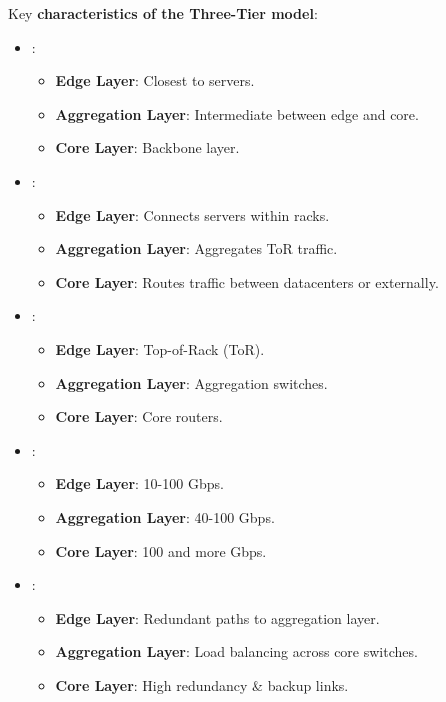 Key \textbf{characteristics of the Three-Tier model}:
\begin{itemize}
    \item {}:
    \begin{itemize}
        \item \textbf{Edge Layer}: Closest to servers.
        \item \textbf{Aggregation Layer}: Intermediate between edge and core.
        \item \textbf{Core Layer}: Backbone layer.
    \end{itemize}
    \item {}:
    \begin{itemize}
        \item \textbf{Edge Layer}: Connects servers within racks.
        \item \textbf{Aggregation Layer}: Aggregates ToR traffic.
        \item \textbf{Core Layer}: Routes traffic between datacenters or externally.
    \end{itemize}
    \item {}:
    \begin{itemize}
        \item \textbf{Edge Layer}: Top-of-Rack (ToR).
        \item \textbf{Aggregation Layer}: Aggregation switches.
        \item \textbf{Core Layer}: Core routers.
    \end{itemize}
    \item {}:
    \begin{itemize}
        \item \textbf{Edge Layer}: 10-100 Gbps.
        \item \textbf{Aggregation Layer}: 40-100 Gbps.
        \item \textbf{Core Layer}: 100 and more Gbps.
    \end{itemize}
    \item {}:
    \begin{itemize}
        \item \textbf{Edge Layer}: Redundant paths to aggregation layer.
        \item \textbf{Aggregation Layer}: Load balancing across core switches.
        \item \textbf{Core Layer}: High redundancy \& backup links.
    \end{itemize}
\end{itemize}

